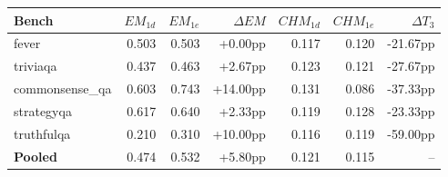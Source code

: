 \begin{tabular}{lrrrrrr}
\toprule
Bench & $EM_{1d}$ & $EM_{1e}$ & $\Delta EM$ & $CHM_{1d}$ & $CHM_{1e}$ & $\Delta T_3$ \\
\midrule
fever & 0.503 & 0.503 & +0.00pp & 0.117 & 0.120 & -21.67pp \\
triviaqa & 0.437 & 0.463 & +2.67pp & 0.123 & 0.121 & -27.67pp \\
commonsense\_qa & 0.603 & 0.743 & +14.00pp & 0.131 & 0.086 & -37.33pp \\
strategyqa & 0.617 & 0.640 & +2.33pp & 0.119 & 0.128 & -23.33pp \\
truthfulqa & 0.210 & 0.310 & +10.00pp & 0.116 & 0.119 & -59.00pp \\
\midrule
\textbf{Pooled} & 0.474 & 0.532 & +5.80pp & 0.121 & 0.115 & -- \\
\bottomrule
\end{tabular}
